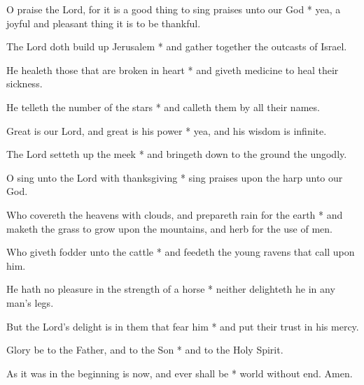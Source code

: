 O praise the Lord, for it is a good thing to sing praises unto our God * yea, a joyful and pleasant thing it is to be thankful.

The Lord doth build up Jerusalem * and gather together the outcasts of Israel.
	
He healeth those that are broken in heart * and giveth medicine to heal their sickness.
	
He telleth the number of the stars * and calleth them by all their names.

Great is our Lord, and great is his power * yea, and his wisdom is infinite.
	
The Lord setteth up the meek * and bringeth down to the ground the ungodly.
	
O sing unto the Lord with thanksgiving * sing praises upon the harp unto our God.

Who covereth the heavens with clouds, and prepareth rain for the earth * and maketh the grass to grow upon the mountains, and herb for the use of men.
	
Who giveth fodder unto the cattle * and feedeth the young ravens that call upon him.
	
He hath no pleasure in the strength of a horse * neither delighteth he in any man's legs.
	
But the Lord's delight is in them that fear him * and put their trust in his mercy.
	
Glory be to the Father, and to the Son * and to the Holy Spirit.
	
As it was in the beginning is now, and ever shall be * world without end. Amen.